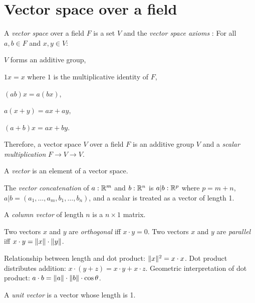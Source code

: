 \section{Vector space over a field}

%
%
A \emph{vector space} over a field \(F\) is a set \(V\) and the
%
\emph{vector space axioms} \cite{wpvectorspace}\cite{roman2005advanced}:
For all \(a, b \in F\) and \(x, y \in V\):
\begin{enumerate*}[label={(\arabic*)}]
    \item \(V\) forms an additive group,
    \item \(1 x = x\) where \(1\) is the multiplicative identity of \(F\),
    \item \((ab)x = a(bx)\),
    \item \(a(x+y) = ax+ay\),
    \item \((a+b)x = ax+by\).
\end{enumerate*}
Therefore, a vector space \(V\) over a field \(F\) is
an additive group \(V\) and a \emph{scalar multiplication} \(F \to V \to V\).

%
A \emph{vector} is an element of a vector space.

%
%
%
The \emph{vector concatenation} of \(a : \mathbb{R}^m\) and \(b : \mathbb{R}^n\)
is \(a|b : \mathbb{R}^p\)
where \(p = m + n\),
\(a|b = (a_1 , \ldots , a_m , b_1 , \ldots , b_n)\),
and a scalar is treated as a vector of length 1.

%
%
A \emph{column vector} of length \(n\) is a \(n \times 1\) matrix.

%
%
Two vectors \(x\) and \(y\) are \emph{orthogonal} iff \(x \cdot y = 0\).
%
%
Two vectors \(x\) and \(y\) are \emph{parallel} iff \(x \cdot y = \lVert x\rVert \cdot \lVert y\rVert\).

%
%
Relationship between length and dot product: \(\lVert x\rVert^2 = x \cdot x\).
Dot product distributes addition: \(x \cdot (y+z) = x \cdot y + x \cdot z\).
Geometric interpretation of dot product: \(a \cdot b = \lVert a\rVert \cdot \lVert b\rVert \cdot \cos \theta\).

%
%
A \emph{unit vector} is a vector whose length is 1.

